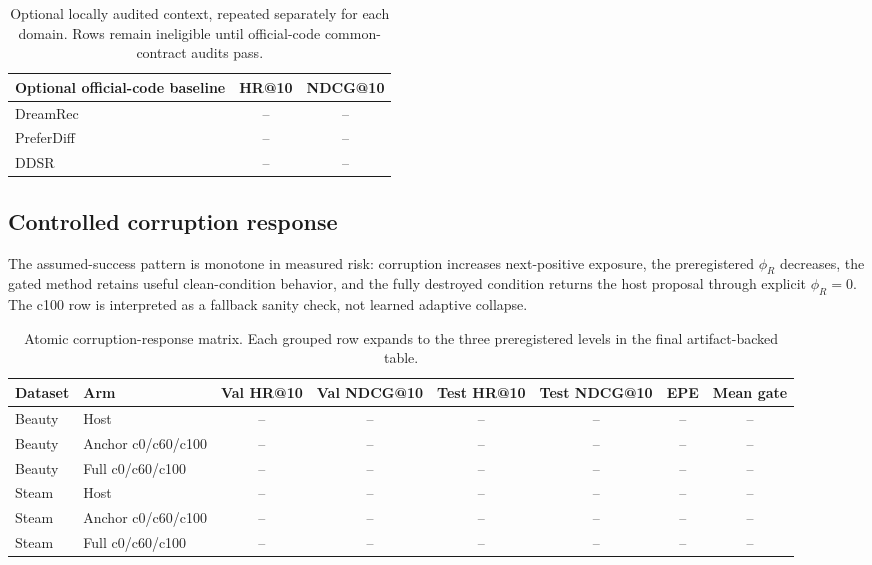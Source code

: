 \documentclass[letterpaper]{article}
\newcommand{\blankcell}{--}
\begin{document}
\begin{table}[t]
\centering\small
\begin{tabular}{lcc}
\toprule
Optional official-code baseline & HR@10 & NDCG@10\\
\midrule
DreamRec & \blankcell & \blankcell\\
PreferDiff & \blankcell & \blankcell\\
DDSR & \blankcell & \blankcell\\
\bottomrule
\end{tabular}
\caption{Optional locally audited context, repeated separately for each domain. Rows remain ineligible until official-code common-contract audits pass.}
\end{table}

\subsection{Controlled corruption response}
The assumed-success pattern is monotone in measured risk: corruption increases next-positive exposure, the preregistered $\phi_R$ decreases, the gated method retains useful clean-condition behavior, and the fully destroyed condition returns the host proposal through explicit $\phi_R=0$. The c100 row is interpreted as a fallback sanity check, not learned adaptive collapse.

\begin{table}[t]
\centering\small
\begin{tabular}{llcccccc}
\toprule
Dataset & Arm & Val HR@10 & Val NDCG@10 & Test HR@10 & Test NDCG@10 & EPE & Mean gate\\
\midrule
Beauty & Host & \blankcell&\blankcell&\blankcell&\blankcell&\blankcell&\blankcell\\
Beauty & Anchor c0/c60/c100 & \blankcell&\blankcell&\blankcell&\blankcell&\blankcell&\blankcell\\
Beauty & Full c0/c60/c100 & \blankcell&\blankcell&\blankcell&\blankcell&\blankcell&\blankcell\\
Steam & Host & \blankcell&\blankcell&\blankcell&\blankcell&\blankcell&\blankcell\\
Steam & Anchor c0/c60/c100 & \blankcell&\blankcell&\blankcell&\blankcell&\blankcell&\blankcell\\
Steam & Full c0/c60/c100 & \blankcell&\blankcell&\blankcell&\blankcell&\blankcell&\blankcell\\
\bottomrule
\end{tabular}
\caption{Atomic corruption-response matrix. Each grouped row expands to the three preregistered levels in the final artifact-backed table.}
\end{table}
\end{document}

